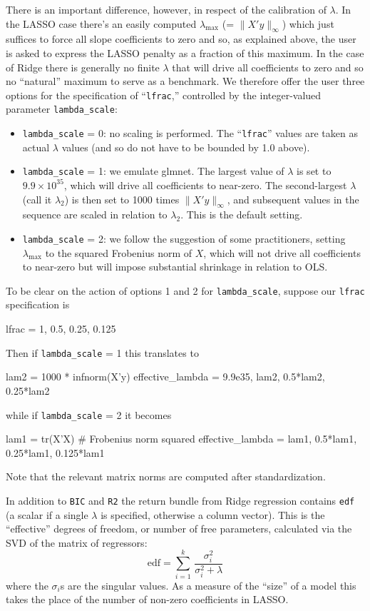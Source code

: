 \documentclass{article}
\begin{document}
There is an important difference, however, in respect of the
calibration of $\lambda$. In the LASSO case there's an easily computed
$\lambda_{\max}$ (= $\|X'y\|_{\infty}$) which just suffices to force
all slope coefficients to zero and so, as explained above, the user is
asked to express the LASSO penalty as a fraction of this maximum. In
the case of Ridge there is generally no finite $\lambda$ that will
drive all coefficients to zero and so no ``natural'' maximum to serve
as a benchmark. We therefore offer the user three options for the
specification of ``\texttt{lfrac},'' controlled by the integer-valued
parameter \texttt{lambda\_scale}:
\begin{itemize}
\item \texttt{lambda\_scale} = 0: no scaling is performed. The
  ``\texttt{lfrac}'' values are taken as actual $\lambda$ values (and
  so do not have to be bounded by 1.0 above).
\item \texttt{lambda\_scale} = 1: we emulate \textsf{glmnet}. The
  largest value of $\lambda$ is set to $9.9 \times 10^{35}$, which
  will drive all coefficients to near-zero. The second-largest
  $\lambda$ (call it $\lambda_2$) is then set to 1000 times
  $\|X'y\|_{\infty}$, and subsequent values in the sequence are scaled
  in relation to $\lambda_2$. This is the default setting.
\item \texttt{lambda\_scale} = 2: we follow the suggestion of some
  practitioners, setting $\lambda_{\max}$ to the squared Frobenius
  norm of $X$, which will not drive all coefficients to near-zero but
  will impose substantial shrinkage in relation to OLS.
\end{itemize}

To be clear on the action of options 1 and 2 for
\texttt{lambda\_scale}, suppose our \texttt{lfrac} specification is
\begin{code}
lfrac = {1, 0.5, 0.25, 0.125}
\end{code}
Then if \texttt{lambda\_scale} = 1 this translates to
\begin{code}
lam2 = 1000 * infnorm(X'y)
effective_lambda = {9.9e35, lam2, 0.5*lam2, 0.25*lam2}
\end{code}
while if \texttt{lambda\_scale} = 2 it becomes
\begin{code}
lam1 = tr(X'X) # Frobenius norm squared
effective_lambda = {lam1, 0.5*lam1, 0.25*lam1, 0.125*lam1}
\end{code}
Note that the relevant matrix norms are computed after
standardization.

In addition to \texttt{BIC} and \texttt{R2} the return bundle from
Ridge regression contains \texttt{edf} (a scalar if a single $\lambda$
is specified, otherwise a column vector). This is the ``effective''
degrees of freedom, or number of free parameters, calculated via
the SVD of the matrix of regressors:
\begin{equation}
  \label{eq:edf}
\mbox{edf} = \sum_{i=1}^k\, \frac{\sigma_i^2}{\sigma_i^2 + \lambda}
\end{equation}
where the $\sigma_i$s are the singular values. As a measure of the
``size'' of a model this takes the place of the number of non-zero
coefficients in LASSO.
\end{document}
